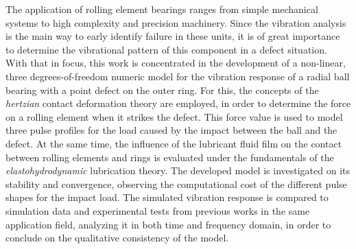 The application of rolling element bearings ranges from simple mechanical systems to high complexity and precision machinery.
Since the vibration analysis is the main way to early identify failure in these units, it is of great importance to determine the vibrational pattern of this component in a defect situation.
With that in focus, this work is concentrated in the development of a non-linear, three degrees-of-freedom numeric model for the vibration response of a radial ball bearing with a point defect on the outer ring.
For this, the concepts of the \emph{hertzian} contact deformation theory are employed, in order to determine the force on a rolling element when it strikes the defect.
This force value is used to model three pulse profiles for the load caused by the impact between the ball and the defect.
At the same time, the influence of the lubricant fluid film on the contact between rolling elements and rings is evaluated under the fundamentals of the \emph{elastohydrodynamic} lubrication theory.
The developed model is investigated on its stability and convergence, observing the computational cost of the different pulse shapes for the impact load.
The simulated vibration response is compared to simulation data and experimental tests from previous works in the same application field, analyzing it in both time and frequency domain, in order to conclude on the qualitative consistency of the model.
